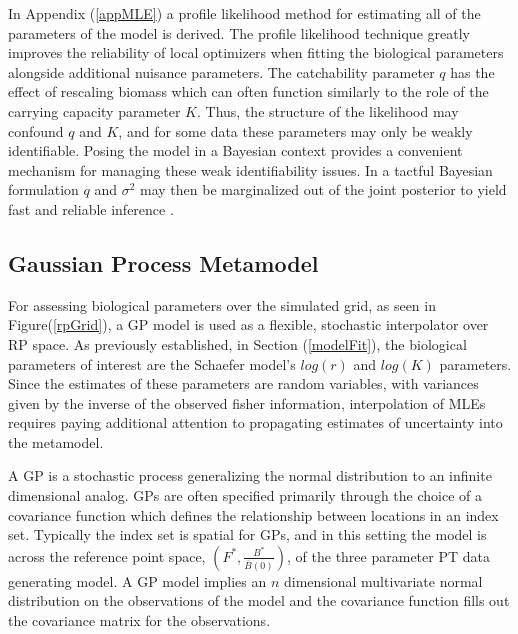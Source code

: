 \documentclass[12pt]{article}
\begin{document}
%
In Appendix (\ref{appMLE}) a profile likelihood method for estimating all of the 
parameters of the model is derived. The profile likelihood technique greatly 
improves the reliability of local optimizers when fitting the biological parameters 
alongside additional nuisance parameters. The catchability parameter $q$ has the 
effect of rescaling biomass which can often function similarly to the role of the 
carrying capacity parameter $K$. Thus, the structure of the likelihood may 
confound $q$ and $K$, and for some data these parameters may only be weakly 
identifiable. Posing the model in a Bayesian context provides a convenient 
mechanism for managing these weak identifiability issues. In a tactful Bayesian 
formulation $q$ and $\sigma^2$ may then be marginalized out of the joint posterior 
to yield fast and reliable inference . %


%  

%
\subsection{Gaussian Process Metamodel}
%

%
For assessing biological parameters over the simulated grid, as seen in 
Figure(\ref{rpGrid}), a GP model is used as a flexible, stochastic interpolator 
over RP space. As previously established, in Section (\ref{modelFit}), the 
biological parameters of interest are the Schaefer model's $log(r)$ and $log(K)$ 
parameters. Since the estimates of these parameters are random variables, with 
variances given by the inverse of the observed fisher information, 
interpolation of MLEs requires paying additional attention to propagating 
estimates of uncertainty into the metamodel. 


%
A GP is a stochastic process generalizing the normal distribution to an
infinite dimensional analog. GPs are often specified primarily through the
choice of a covariance function which defines the relationship between
locations in an index set. Typically the index set is spatial for GPs, and in
this setting the model is across the reference point space, 
$\left(F^*, \frac{B^*}{\bar B(0)}\right)$, of the three parameter
PT data generating model. A GP model implies an $n$ dimensional multivariate 
normal distribution on the observations of the model and the covariance function 
fills out the covariance matrix for the observations.
\end{document}

